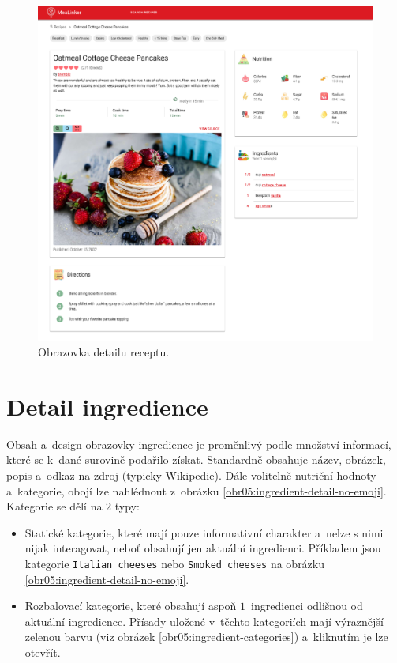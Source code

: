 \begin{figure}[h!]\centering
\includegraphics[width=140mm]{../img/recipe-detail}
\caption{Obrazovka detailu receptu.}
\label{obr05:recipe-detail}
\end{figure}

\section{Detail ingredience}

Obsah a~design obrazovky ingredience je proměnlivý podle množství informací, které se k~dané surovině podařilo získat. Standardně obsahuje název, obrázek, popis a~odkaz na zdroj (typicky Wikipedie). Dále volitelně nutriční hodnoty a~kategorie, obojí lze nahlédnout z~obrázku \ref{obr05:ingredient-detail-no-emoji}. Kategorie se dělí na $2$ typy:
\begin{itemize}
    \item Statické kategorie, které mají pouze informativní charakter a~nelze s nimi nijak interagovat, neboť obsahují jen aktuální ingredienci. Příkladem jsou kategorie \texttt{Italian cheeses} nebo \texttt{Smoked cheeses} na obrázku \ref{obr05:ingredient-detail-no-emoji}.
    \item Rozbalovací kategorie, které obsahují aspoň $1$~ingredienci odlišnou od aktuální ingredience. Přísady uložené v~těchto kategoriích mají výraznější zelenou barvu (viz obrázek \ref{obr05:ingredient-categories}) a~kliknutím je lze otevřít.
\end{itemize}

